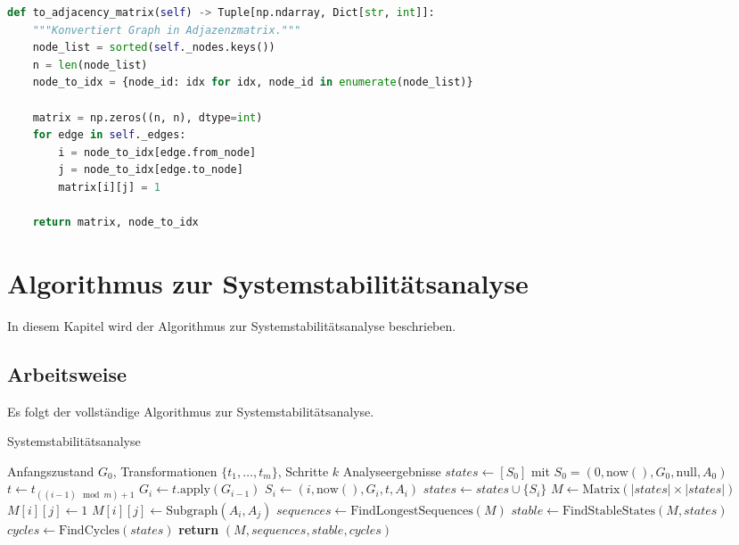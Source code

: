 \documentclass[a4paper,12pt]{article}
\theoremstyle{definition}
\begin{document}
\begin{lstlisting}[language=Python, caption=Graph-Adjazenzmatrix Konvertierung]
def to_adjacency_matrix(self) -> Tuple[np.ndarray, Dict[str, int]]:
	"""Konvertiert Graph in Adjazenzmatrix."""
	node_list = sorted(self._nodes.keys())
	n = len(node_list)
	node_to_idx = {node_id: idx for idx, node_id in enumerate(node_list)}
	
	matrix = np.zeros((n, n), dtype=int)
	for edge in self._edges:
		i = node_to_idx[edge.from_node]
		j = node_to_idx[edge.to_node]
		matrix[i][j] = 1
	
	return matrix, node_to_idx
\end{lstlisting}

\section{Algorithmus zur Systemstabilitätsanalyse}

In diesem Kapitel wird der Algorithmus zur Systemstabilitätsanalyse beschrieben.

\subsection{Arbeitsweise}

Es folgt der vollständige Algorithmus zur Systemstabilitätsanalyse.

\begin{algorithm}[H]
	\caption{Systemstabilitätsanalyse}
	\begin{algorithmic}[1]
		\Require Anfangszustand $G_0$, Transformationen $\{t_1, \ldots, t_m\}$, Schritte $k$
		\Ensure Analyseergebnisse
		\State $states \gets [S_0]$ mit $S_0 = (0, \text{now}(), G_0, \text{null}, A_0)$
		\State $t \gets t_{((i-1) \mod m) + 1}$ 
		\State $G_i \gets t.\text{apply}(G_{i-1})$
		\State $S_i \gets (i, \text{now}(), G_i, t, A_i)$
		\State $states \gets states \cup \{S_i\}$
		\EndFor
		\State
		\State $M \gets \text{Matrix}(|states| \times |states|)$
		\State $M[i][j] \gets 1$
		\Else
		\State $M[i][j] \gets \text{Subgraph}(A_i, A_j)$
		\EndIf
		\EndFor
		\EndFor
		\State
		\State $sequences \gets \text{FindLongestSequences}(M)$
		\State $stable \gets \text{FindStableStates}(M, states)$
		\State $cycles \gets \text{FindCycles}(states)$
		\State
		\State \textbf{return} $(M, sequences, stable, cycles)$
	\end{algorithmic}
\end{algorithm}
\end{document}
